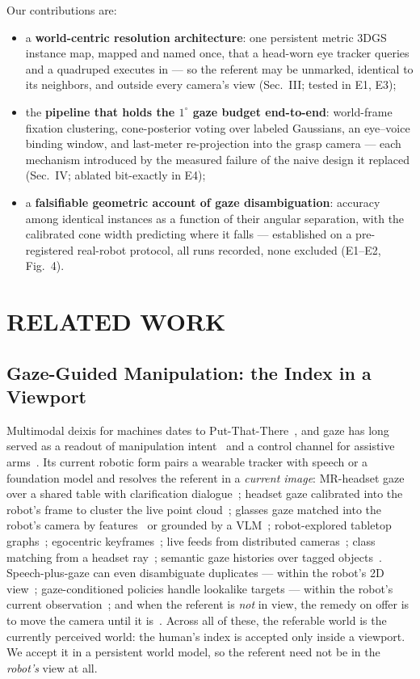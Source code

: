 \documentclass[letterpaper, 10 pt, conference]{ieeeconf}  %
\begin{document}
Our contributions are:
\begin{itemize}
\item a \textbf{world-centric resolution architecture}: one
persistent metric 3DGS instance map, mapped and named once, that a
head-worn eye tracker queries and a quadruped executes in --- so the
referent may be unmarked, identical to its neighbors, and outside
every camera's view (Sec.~III; tested in E1, E3);
\item the \textbf{pipeline that holds the $1^\circ$ gaze budget
end-to-end}: world-frame fixation clustering, cone-posterior voting
over labeled Gaussians, an eye--voice binding window, and last-meter
re-projection into the grasp camera --- each mechanism introduced by
the measured failure of the naive design it replaced (Sec.~IV;
ablated bit-exactly in E4);
\item a \textbf{falsifiable geometric account of gaze
disambiguation}: accuracy among identical instances as a function of
their angular separation, with the calibrated cone width predicting
where it falls --- established on a pre-registered real-robot
protocol, all runs recorded, none excluded (E1--E2, Fig.~4).
\end{itemize}

\section{RELATED WORK}

\subsection{Gaze-Guided Manipulation: the Index in a Viewport}
Multimodal deixis for machines dates to
Put-That-There~\cite{bolt1980}, and gaze has long served as a readout
of manipulation intent~\cite{belardinelli2024,huang2015} and a
control channel for assistive arms~\cite{fischerjanzen2024}. Its
current robotic form pairs a wearable tracker with speech or a
foundation model and resolves the referent in a \emph{current image}:
MR-headset gaze over a shared table with clarification
dialogue~\cite{rosen2020}; headset gaze calibrated into the robot's
frame to cluster the live point
cloud~\cite{weber2022,weber2023}; glasses gaze matched into the
robot's camera by features~\cite{famhri} or grounded by a
VLM~\cite{gamma2026}; robot-explored tabletop
graphs~\cite{glancesay}; egocentric keyframes~\cite{edith}; live
feeds from distributed cameras~\cite{rueppel2025}; class matching
from a headset ray~\cite{raycastgrasp2025}; semantic gaze histories
over tagged objects~\cite{semanticscanpath}. Speech-plus-gaze can
even disambiguate duplicates --- within the robot's 2D
view~\cite{humanoids2023}; gaze-conditioned policies handle lookalike
targets --- within the robot's current
observation~\cite{gaze2act2025}; and when the referent is \emph{not}
in view, the remedy on offer is to move the camera until it
is~\cite{yuguchi2019}. Across all of these, the referable world is
the currently perceived world: the human's index is accepted only
inside a viewport. We accept it in a persistent world model, so the
referent need not be in the \emph{robot's} view at all.
\end{document}
